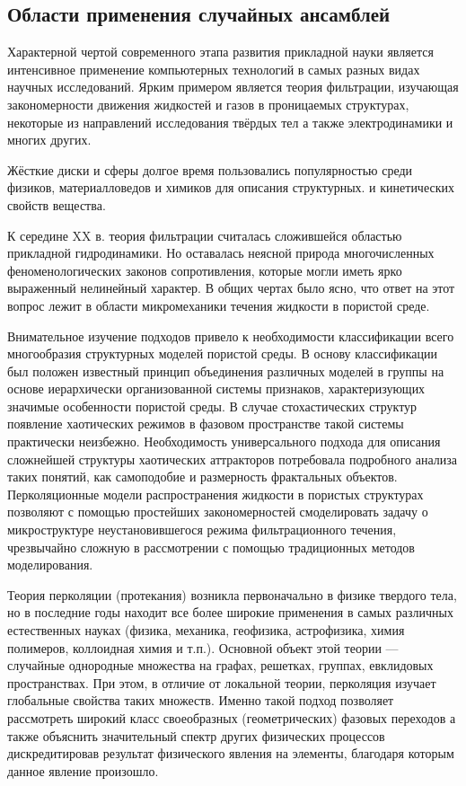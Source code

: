 \subsection{Области применения случайных ансамблей}


Характерной чертой современного этапа развития прикладной науки является интенсивное применение компьютерных технологий в самых разных видах научных исследований. Ярким примером является теория фильтрации, изучающая закономерности движения жидкостей и газов в проницаемых структурах, некоторые из направлений исследования твёрдых тел а также электродинамики и многих других.

Жёсткие диски и сферы долгое время пользовались популярностью среди физиков, материалловедов и химиков для описания структурных. и кинетических свойств вещества. 

К середине XX в. теория фильтрации считалась сложившейся областью прикладной гидродинамики. Но оставалась неясной природа многочисленных феноменологических законов сопротивления, которые могли иметь ярко выраженный нелинейный характер. В общих чертах было ясно, что ответ на этот вопрос лежит в области микромеханики течения жидкости в пористой среде. 

Внимательное изучение подходов привело к необходимости классификации всего многообразия структурных моделей пористой среды. В основу классификации был положен известный принцип объединения различных моделей в группы на основе иерархически организованной системы признаков, характеризующих значимые особенности пористой среды. В случае стохастических структур появление хаотических режимов в фазовом пространстве такой системы практически неизбежно. Необходимость универсального подхода для описания сложнейшей структуры хаотических аттракторов потребовала подробного анализа таких понятий, как самоподобие и размерность фрактальных объектов. Перколяционные модели распространения жидкости в пористых структурах позволяют с помощью простейших закономерностей смоделировать задачу о микроструктуре неустановившегося режима фильтрационного течения, чрезвычайно сложную в рассмотрении с помощью традиционных методов моделирования.

Теория перколяции (протекания) возникла первоначально в физике твердого тела, но в последние годы находит все более широкие применения в самых различных естественных науках (физика, механика, геофизика, астрофизика, химия полимеров, коллоидная химия и т.п.). Основной объект этой теории — случайные однородные множества на графах, решетках, группах, евклидовых пространствах. При этом, в отличие от локальной теории, перколяция изучает глобальные свойства таких множеств. Именно такой подход позволяет рассмотреть широкий класс своеобразных (геометрических) фазовых переходов а также объяснить значительный спектр других физических процессов дискредитировав результат физического явления на элементы, благодаря которым данное явление произошло.

